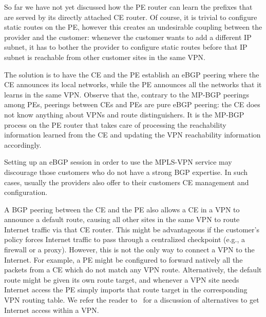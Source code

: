 \documentclass{article}
\begin{document}
So far we have not yet discussed how the PE router can learn the prefixes that 
are served by its directly attached CE router. Of course, it is trivial to 
configure static routes on the PE, however this creates an undesirable 
coupling between the provider and the customer: whenever the customer wants to 
add a different IP subnet, it has to bother the provider to configure static 
routes before that IP subnet is reachable from other customer sites in the same 
VPN.

The solution is to have the CE and the PE establish an eBGP peering where the CE 
announces its local networks, while the PE announces all the networks that it 
learns in the same VPN. Observe that the, contrary to the MP-BGP peerings among 
PEs, peerings between CEs and PEs are pure eBGP peering: the CE does not know 
anything about VPNs and route distinguishers. It is the MP-BGP process on the PE 
router that takes care of processing the reachability information learned from 
the CE and updating the VPN reachability information accordingly.

Setting up an eBGP session in order to use the MPLS-VPN service may discourage 
those customers who do not have a strong BGP expertise. In such cases, usually 
the providers also offer to their customers CE management and configuration.

A BGP peering between the CE and the PE also allows a CE in a VPN to announce a 
default route, causing all other sites in the same VPN to route Internet traffic 
via that CE router. This might be advantageous if the customer's policy forces 
Internet traffic to pass through a centralized checkpoint (e.g., a firewall or a 
proxy). However, this is not the only way to connect a VPN to the Internet. For 
example, a PE might be configured to forward natively all the packets from a CE 
which do not match any VPN route. Alternatively, the default route might be 
given its own route target, and whenever a VPN site needs Internet access the PE 
simply imports that route target in the corresponding VPN routing table. We 
refer the reader to~\cite{rfc4364} for a discussion of alternatives to get 
Internet access within a VPN.
\end{document}
